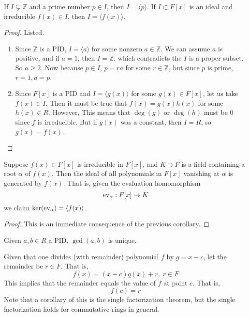   \begin{corollary}
    If $I \subsetneq \mathbb{Z}$ and a prime number $p \in I$, then $I = \langle p \rangle$. If $I \subset F[x]$ is an ideal and irreducible $f(x) \in I$, then $I = \langle f(x) \rangle$. 
  \end{corollary}
  \begin{proof}
    Listed. 
    \begin{enumerate}
      \item Since $\mathbb{Z}$ is a PID, $I = \langle a \rangle$ for some nonzero $a \in \mathbb{Z}$. We can assume $a$ is positive, and if $a = 1$, then $I = \mathbb{Z}$, which contradicts the $I$ is a proper subset. So $a \geq 2$. Now because $p \in I$, $p = ra$ for some $r \in \mathbb{Z}$, but since $p$ is prime, $r = 1, a = p$. 

      \item Since $F[x]$ is a PID and $I = \langle g(x) \rangle$ for some $g(x) \in F[x]$, let us take $f(x) \in I$. Then it must be true that $f(x) = g(x) h(x)$ for some $h(x) \in R$. However, This means that $\deg(g)$ or $\deg(h)$ must be $0$ since $f$ is irreducible. But if $g(x)$ was a constant, then $I = R$, so $g(x) = f(x)$. 
    \end{enumerate}
  \end{proof}

  \begin{corollary}
    Suppose $f(x) \in F[x]$ is irreducible in $F[x]$, and $K \supset F$ is a field containing a root $\alpha$ of $f(x)$. Then the ideal of all polynomials in $F[x]$ vanishing at $\alpha$ is generated by $f(x)$. That is, given the evaluation homomorphism 
    \begin{equation}
      \operatorname{ev}_\alpha: F[x] \rightarrow K
    \end{equation}
    we claim $\ker(\operatorname{ev}_\alpha) = \langle f(x) \rangle$. 
  \end{corollary}
  \begin{proof}
    This is an immediate consequence of the previous corollary. 
  \end{proof}

  \begin{theorem}
    Given $a, b \in R$ a PID, $\gcd(a, b)$ is unique. 
  \end{theorem}

  \begin{theorem}
    Given that one divides (with remainder) polynomial $f$ by $g = x - c$, let the remainder be $r \in F$. That is, 
    \begin{equation}
      f(x) = (x-c) q(x) + r, \; r \in F
    \end{equation}
    This implies that the remainder equals the value of $f$ at point $c$. That is, 
    \begin{equation}
      f(c) = r
    \end{equation}
    Note that a corollary of this is the single factorization theorem, but the single factorization holds for commutative rings in general. 
  \end{theorem} 

